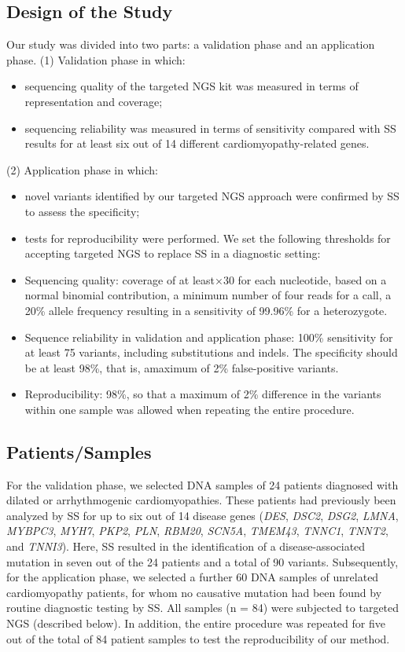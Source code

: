 \subsection{Design of the Study}
Our study was divided into two parts: a validation phase and an application phase.
(1) Validation phase in which:
\begin{itemize}
	\item sequencing quality of the targeted NGS kit was measured in terms of representation and coverage;
	\item sequencing reliability was measured in terms of sensitivity compared with SS results for at least six out of 14 different cardiomyopathy-related genes.
\end{itemize}
(2) Application phase in which:
\begin{itemize}
	\item novel variants identified by our targeted NGS approach were confirmed by SS to assess the specificity;
	\item tests for reproducibility were performed. We set the following thresholds for accepting targeted NGS to replace SS in a diagnostic setting:
	\item Sequencing quality: coverage of at least×30 for each nucleotide, based on a normal binomial contribution, a minimum number of four reads for a call, a 20\% allele frequency resulting in a sensitivity of 99.96\% for a heterozygote.
	\item Sequence reliability in validation and application phase: 100\% sensitivity for at least 75 variants, including substitutions and indels. The specificity should be at least 98\%, that is, amaximum of 2\% false-positive variants.
	\item Reproducibility: 98\%, so that a maximum of 2\% difference in the variants within one sample was allowed when repeating the entire procedure. 
\end{itemize}

\subsection{Patients/Samples}
For the validation phase, we selected DNA samples of 24 patients diagnosed with dilated or arrhythmogenic cardiomyopathies. 
These patients had previously been analyzed by SS for up to six out of 14 disease genes (\textsl{DES}, \textsl{DSC2}, \textsl{DSG2}, \textsl{LMNA}, \textsl{MYBPC3}, \textsl{MYH7}, \textsl{PKP2}, \textsl{PLN}, \textsl{RBM20}, \textsl{SCN5A}, \textsl{TMEM43}, \textsl{TNNC1}, \textsl{TNNT2}, and \textsl{TNNI3}). 
Here, SS resulted in the identification of a disease-associated mutation in seven out of the 24 patients and a total of 90 variants. 
Subsequently, for the application phase, we selected a further 60 DNA samples of unrelated cardiomyopathy patients, for whom no causative mutation had been found by routine diagnostic testing by SS. 
All samples (n = 84) were subjected to targeted NGS (described below). 
In addition, the entire procedure was repeated for five out of the total of 84 patient samples to test the reproducibility of our method.

